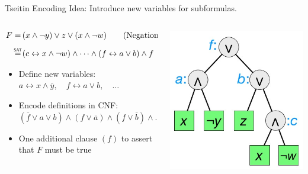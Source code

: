\documentclass[t]{sdqbeamer}
\begin{document}
\begin{frame}{Tseitin Encoding}
Idea: Introduce new variables for subformulas.
\begin{example}
	\begin{columns}
	\begin{column}{0.6\textwidth}
		\vspace*{-3ex}
		\begin{align*}
			F =&\, (x \land \lnot y) \lor z \lor (x \land \lnot w) \tag{Negation Normal Form} \\[1ex]
			  \sateq &\, (c \leftrightarrow x \land \lnot w) \land \dots \land (f \leftrightarrow a \lor b) \land f \tag{Tseitin Encoding}
		\end{align*}
		\begin{itemize}\setlength{\itemsep}{1ex}
			\item Define new variables: $a \leftrightarrow x \land \overline{y}, \quad f \leftrightarrow a \lor b, \quad \dots$
			\item Encode definitions in CNF:
				$(\overline{f} \lor a \lor b) \land (f \lor \overline{a}) \land (f \lor \overline{b}) \land \dots$
			\item One additional clause $(f)$ to assert that $F$ must be true
		\end{itemize}
	\end{column}
	\begin{column}{0.4\textwidth}
	\begin{center}
		\includegraphics[height=0.6\textwidth]{figures/l02/formula-graph-2.jpg}
	\end{center}
	\end{column}
	\end{columns}
\end{example}
\end{frame}
\end{document}
